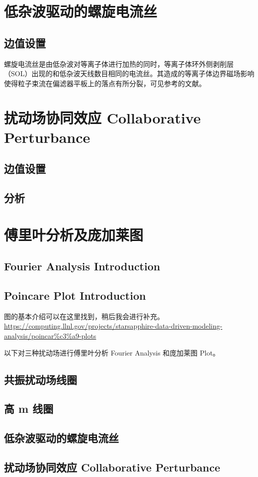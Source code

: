 \section{低杂波驱动的螺旋电流丝}
\subsection{边值设置}
螺旋电流丝是由低杂波对等离子体进行加热的同时，等离子体环外侧剥削层（SOL）出现的和低杂波天线数目相同的电流丝。其造成的等离子体边界磁场影响使得粒子束流在偏滤器平板上的落点有所分裂，可见参考的文献。

\section{扰动场协同效应 Collaborative Perturbance}
\subsection{边值设置}
\subsection{分析}

\section{傅里叶分析及庞加莱图}

\subsection{Fourier Analysis Introduction}

\subsection{Poincare Plot Introduction}
\Poincare 图的基本介绍可以在这里找到，稍后我会进行补充。
\url{https://computing.llnl.gov/projects/starsapphire-data-driven-modeling-analysis/poincar%c3%a9-plots}



以下对三种扰动场进行傅里叶分析 Fourier Analysis 和庞加莱图 \Poincare Plot。
\subsection{共振扰动场线圈}
\subsection{高 m 线圈}
\subsection{低杂波驱动的螺旋电流丝}
\subsection{扰动场协同效应 Collaborative Perturbance}